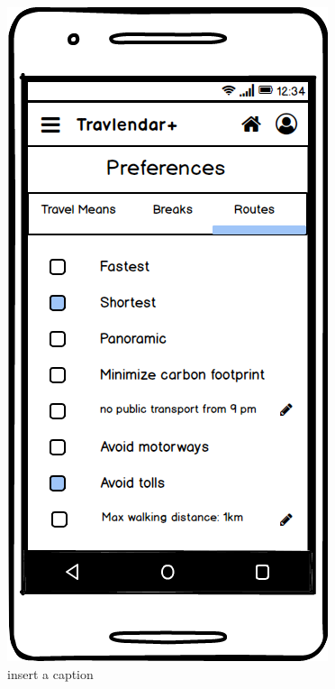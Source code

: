 \documentclass[11pt]{article}
\begin{document}
		\begin{figure}
		\centering
		\includegraphics[width=0.7\linewidth]{PreferencesRoutes.png}
		\caption{insert a caption}
		\label{fig:preferencesroutes}
	\end{figure}
	
	


	
\end{document}
